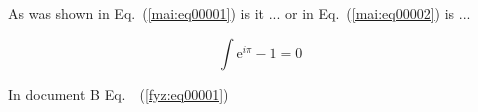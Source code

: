 \documentclass{scrbook}
\begin{document}
  \shorthandoff{-}
  
  \frontmatter
    
    \tableofcontents
  \mainmatter 
    \setcounter{page}{3} 

    As was shown in Eq.~(\ref{mai:eq00001}) is it
    ... or in Eq.~(\ref{mai:eq00002}) is ...

    \begin{equation}
      \int\mathrm{e}^{i\pi}-1=0 \label{tky:eq00001}
    \end{equation}

    In document B Eq.~~(\ref{fyz:eq00001}) 

    
    
    
    
    
    
    
    
    
    
  \backmatter
\end{document}
